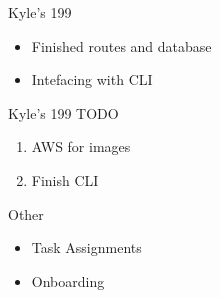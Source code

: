 
\begin{frame}{Kyle's 199}
    \begin{itemize}
        \item Finished routes and database
        \item Intefacing with CLI
    \end{itemize}    
\end{frame}

\begin{frame}{Kyle's 199 TODO}
    \begin{enumerate}
        \item AWS for images
        \item Finish CLI
    \end{enumerate}
\end{frame}

\begin{frame}{Other}
    \begin{itemize}
        \item Task Assignments
        \item Onboarding
    \end{itemize}    
\end{frame}



